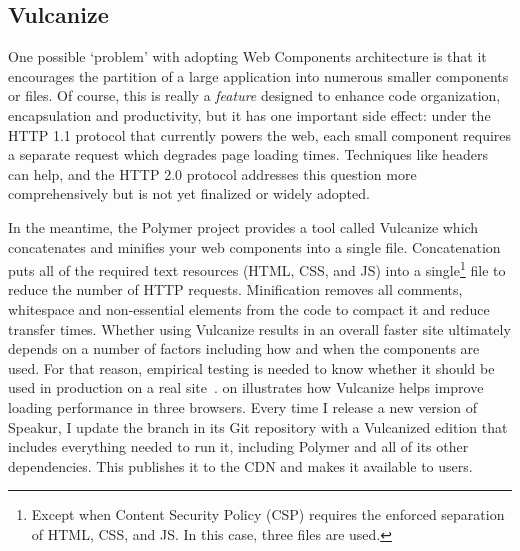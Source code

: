 \subsection{Vulcanize}
One possible `problem' with adopting Web Components architecture is that it encourages the partition of a large application into numerous smaller components or files.
Of course, this is really a \textit{feature} designed to enhance code organization, encapsulation and productivity, 
but it has one important side effect: 
under the HTTP 1.1 protocol that currently powers the web, each small component requires a separate request which degrades page loading times.
Techniques like  headers can help, and the HTTP 2.0 protocol addresses this question more comprehensively but is not yet finalized or widely adopted.

In the meantime, the Polymer project provides a tool called Vulcanize which concatenates and minifies your web components into a single file.
Concatenation puts all of the required text resources (HTML, CSS, and JS) into a 
single\footnote{Except when Content Security Policy (CSP) requires the enforced separation of HTML, CSS, and JS. In this case, three files are used.}
file to reduce the number of HTTP requests.
Minification removes all comments, whitespace and non-essential elements from the code to compact it and reduce transfer times.
Whether using Vulcanize results in an overall faster site ultimately depends on a number of factors including how and when the components are used.
For that reason, empirical testing is needed to know whether it should be used in production on a real site~\cite{polymercontributors2015-a}.
 on  illustrates how Vulcanize helps improve loading performance in three browsers.
Every time I release a new version of Speakur, I update the  branch in its Git repository with a Vulcanized edition that includes everything needed to run it, including Polymer and all of its other dependencies.
This publishes it to the  CDN and makes it available to users.
